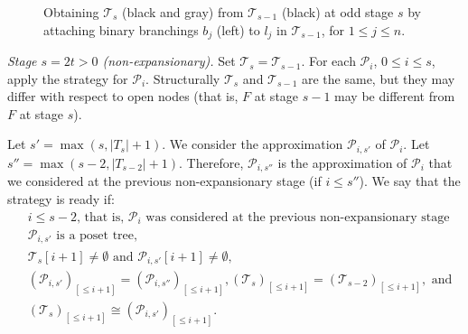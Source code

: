 \documentclass[a4paper,UKenglish,cleveref, autoref, thm-restate]{lipics-v2021}
\begin{document}
\begin{figure}
     \caption{Obtaining $\mathcal T_s$ (black and gray) from $\mathcal T_{s-1}$ (black) at odd stage $s$ by attaching binary branchings $b_j$ (left) to $l_j$ in $\mathcal T_{s-1}$, for $1 \leq j \leq n$.}
    \label{fig:extendodd}
\end{figure}



\emph{Stage $s = 2t > 0$ (non-expansionary).} Set $\mathcal T_s = \mathcal T_{s-1}$. For each $\mathcal P_i$, $0 \leq i \leq s$, apply the strategy for $\mathcal P_i$. Structurally $\mathcal T_s$ and $\mathcal T_{s-1}$ are the same, but they may differ with respect to open nodes (that is, $F$ at stage $s-1$ may be different from $F$ at stage $s$).




Let $s' = \max(s, |T_s| + 1)$. We consider the approximation $\mathcal P_{i,s'}$ of $\mathcal P_i$. Let $s'' = \max(s-2, |T_{s-2}| + 1)$. Therefore, $\mathcal P_{i,s''}$ is the approximation of $\mathcal P_i$ that we considered at the previous non-expansionary stage (if $i \leq s''$).  We say that the strategy is ready if:
\begin{align}
    & i \leq s-2 \text{, that is, $\mathcal P_i$ was considered at the previous non-expansionary stage} \label{item:previous} \\
    & \mathcal{P}_{i,s'} \text{ is a poset tree,} \label{item:treetest} \\
    & \mathcal{T}_{s}[i+1] \neq \emptyset \text{ and } \mathcal{P}_{i,s'}[i+1] \neq \emptyset, \label{item:leveltest} \\
    & (\mathcal{P}_{i,s'})_{[\leq i + 1]}= (\mathcal{P}_{i,s''})_{[\leq i + 1]} ,  (\mathcal{T}_{s})_{[\leq i + 1]}= (\mathcal{T}_{s-2})_{[\leq i + 1]}, \text{ and}  \label{item:idtest} \\
    & (\mathcal{T}_{s})_{[\leq i + 1]} \cong (\mathcal{P}_{i,s'})_{[\leq i + 1]}. \label{item:isomtest} 
\end{align}
\end{document}
